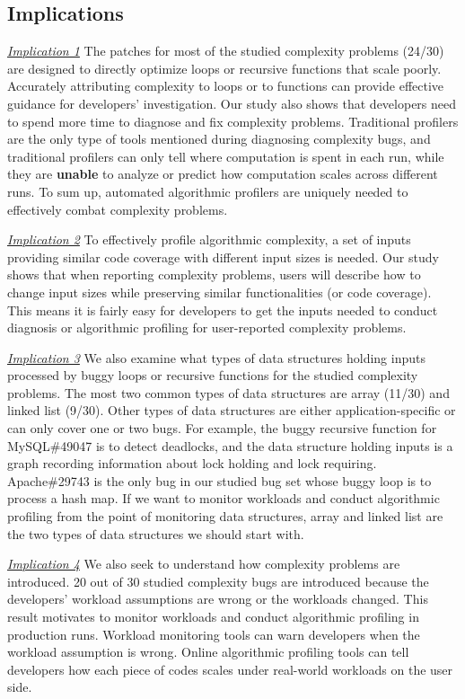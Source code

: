 {{\subsection{Implications}
\label{sec:study_impli}

{\underline{\textit{Implication 1}}
The patches for most of the studied complexity problems (24/30)
are designed to directly optimize loops or recursive functions that scale poorly.
Accurately attributing complexity to loops or to functions can provide 
effective guidance for developers' investigation. 
Our study also shows that developers need to spend more time to 
diagnose and fix complexity problems.
Traditional profilers are the only type of tools 
mentioned during diagnosing complexity bugs, 
and traditional profilers can only tell where computation is spent in each run, 
while they are {\bf unable} to analyze or predict how computation scales across different runs.
To sum up, automated algorithmic profilers are 
uniquely needed to effectively combat complexity problems.  


{\underline{\textit{Implication 2}}
To effectively profile algorithmic complexity,
a set of inputs providing similar code coverage with different input sizes is needed. 
Our study shows that when reporting complexity problems,
users will describe how to change input sizes 
while preserving similar functionalities (or code coverage). 
This means it is fairly easy for developers to get the inputs needed 
to conduct diagnosis or algorithmic profiling for user-reported complexity problems. 

{\underline{\textit{Implication 3}}}
We also examine what types of data structures holding inputs processed 
by buggy loops or recursive functions for the studied complexity problems.
The most two common types of data structures 
are array (11/30) and linked list (9/30).
Other types of data structures are either application-specific or 
can only cover one or two bugs.
For example, the buggy recursive function for MySQL\#49047 is to detect deadlocks,
and the data structure holding inputs is a graph recording information about lock holding and lock requiring. 
Apache\#29743 is the only bug in our studied bug set 
whose buggy loop is to process a hash map. 
If we want to monitor workloads and conduct 
algorithmic profiling from the point of monitoring data structures, 
array and linked list are the two types of data structures 
we should start with.

{\underline{\textit{Implication 4}}
We also seek to understand how complexity problems are introduced. 
20 out of 30 studied complexity bugs are introduced
because the developers' workload assumptions are wrong or the workloads changed. 
This result motivates to monitor workloads and conduct algorithmic profiling in production runs. 
Workload monitoring tools can warn developers when the workload assumption is wrong.
Online algorithmic profiling tools can tell developers 
how each piece of codes scales under real-world workloads on the user side.  

}}}}}
